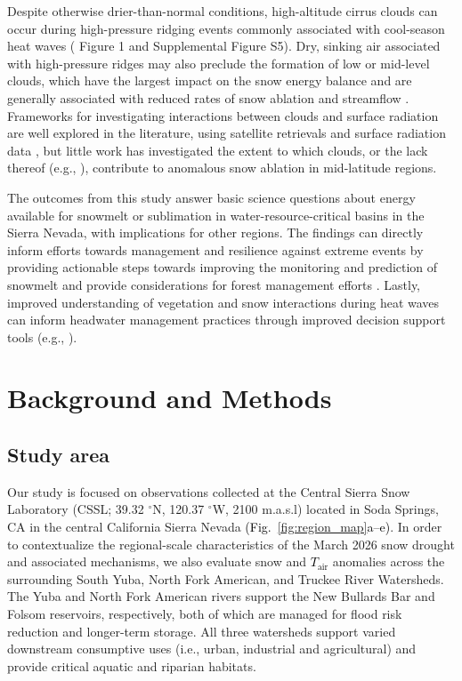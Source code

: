 \documentclass[draft]{agujournal2019}
\newcommand{\fig}[2]{\textcolor{black}{(Fig.~\ref{#1}{#2})}}   %
\newcommand{\tair}{\textcolor{black}{$T_{\mathrm{air}}$}\xspace}
\begin{document}
Despite otherwise drier-than-normal conditions, high-altitude cirrus clouds can occur during high-pressure ridging events commonly associated with cool-season heat waves ( Figure 1 and Supplemental Figure S5). 
Dry, sinking air associated with high-pressure ridges may also preclude the formation of low or mid-level clouds, which have the largest impact on the snow energy balance \cite{Rudisill2025-cx} and are generally associated with reduced rates of snow ablation and streamflow \cite{Sumargo2018-zf}.
Frameworks for investigating interactions between clouds and surface radiation are well explored in the literature, using satellite retrievals and surface radiation data \cite{Ramanathan1989-pa, Shupe2004-kl, L-Ecuyer2019-my}, but little work has investigated the extent to which clouds, or the lack thereof (e.g., ), contribute to anomalous snow ablation in mid-latitude regions.

The outcomes from this study answer basic science questions about energy available for snowmelt or sublimation in water-resource-critical basins in the Sierra Nevada, with implications for other regions.
The findings can directly inform efforts towards management and resilience against extreme events by providing actionable steps towards improving the monitoring and prediction of snowmelt and provide considerations for forest management efforts \cite{Harpold2020-rc}.
Lastly, improved understanding of vegetation and snow interactions during heat waves can inform headwater management practices through improved decision support tools (e.g., ).


\section{Background and Methods}


\subsection{Study area}\label{sec:study_area}
Our study is focused on observations collected at the Central Sierra Snow Laboratory (CSSL; 39.32 $^\circ$N, 120.37 $^\circ$W, 2100 m.a.s.l) located in Soda Springs, CA \cite{Schwartz_Cowherd_McGurk_Mason_Riker-Coleman_Zutter_Lewis_2026} in the central California Sierra Nevada \fig{fig:region_map}{a--e}.
In order to contextualize the regional-scale characteristics of the March 2026 snow drought and associated mechanisms, we also evaluate snow and \tair anomalies across the surrounding 
South Yuba, North Fork American, and Truckee River Watersheds.
The Yuba and North Fork American rivers support the New Bullards Bar and Folsom reservoirs, respectively, both of which are managed for flood risk reduction and longer-term storage.
All three watersheds support varied downstream consumptive uses (i.e., urban, industrial and agricultural) and provide critical aquatic and riparian habitats.
\end{document}
